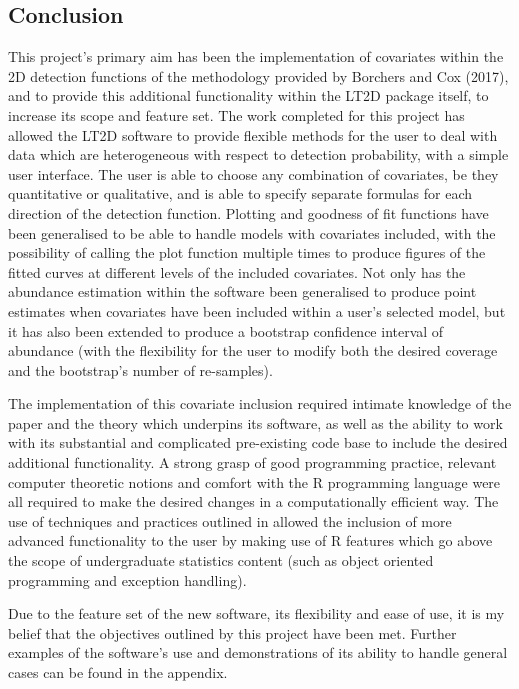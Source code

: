 \documentclass[11pt]{article}
\begin{document}
\begin{multicols}{2}
\section{Conclusion}
This project's primary aim has been the implementation of covariates within the 2D detection functions of the methodology provided by Borchers and Cox (2017), and to provide this additional functionality within the LT2D package itself, to increase its scope and feature set. The work completed for this project has allowed the LT2D software  to provide flexible methods for the user to deal with data which are heterogeneous with respect to detection probability, with a simple user interface. The user is able to choose any combination of covariates, be they quantitative or qualitative, and is able to specify separate formulas for each direction of the detection function. Plotting and goodness of fit functions have been generalised to be able to handle models with covariates included, with the possibility of calling the plot function multiple times to produce figures of the fitted curves at different levels of the included covariates. Not only has the abundance estimation within the software been generalised to produce point estimates when covariates have been included within a user's selected model, but it has also been extended to produce a bootstrap confidence interval of abundance (with the flexibility for the user to modify both the desired coverage and the bootstrap's  number of re-samples). 

The implementation of this covariate inclusion required intimate knowledge of the \cite{Borchers} paper and the theory which underpins its software, as well as the ability to work with its substantial and complicated pre-existing code base to include the desired additional functionality. A strong grasp of good programming practice, relevant computer theoretic notions and comfort with the R programming language were all required to make the desired changes in a computationally efficient way. The use of techniques and practices outlined in \cite{Hadley} allowed the inclusion of more advanced functionality to the user by making use of R features which go above the scope of undergraduate statistics content (such as object oriented programming and exception handling). 

Due to the feature set of the new software, its flexibility and ease of use, it is my belief that the objectives outlined by this project have been met. Further examples of the software's use and demonstrations of its ability to handle general cases can be found in the appendix.



\end{multicols}
\end{document}
